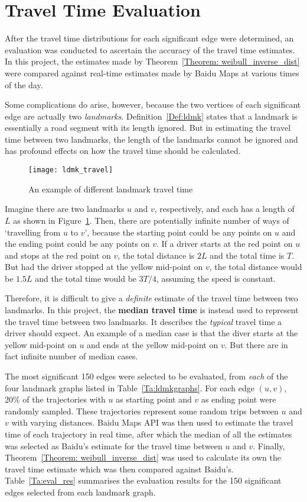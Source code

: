 \section{Travel Time Evaluation}
After the travel time distributions for each significant edge were determined, an eva\-luation was conducted to ascertain the accuracy of the travel time estimates. In this project, the estimates made by Theorem~\ref{Theorem: weibull_inverse_dist} were compared against real-time estimates made by Baidu Maps at various times of the day. 

Some complications do arise, however, because the two vertices of each significant edge are actually two \emph{landmarks}. Definition~\ref{Def:ldmk} states that a landmark is essentially a road segment with its length ignored. But in estimating the travel time between two landmarks, the length of the landmarks cannot be ignored and has profound effects on how the travel time should be calculated. 

\begin{figure}[h!]
\texttt{[image: ldmk\_travel]}
\centering
\caption{An example of different landmark travel time}\label{Fig:ldmk_travel}
\end{figure}

Imagine there are two landmarks $u$ and $v$, respectively, and each has a length of $L$ as shown in Figure~\ref{Fig:ldmk_travel}. Then, there are potentially infinite number of ways of `travelling from $u$ to $v$', because the starting point could be any points on $u$ and the ending point could be any points on $v$. If a driver starts at the red point on $u$ and stops at the red point on $v$, the total distance is $2L$ and the total time is $T$. But had the driver stopped at the yellow mid-point on $v$, the total distance would be $1.5L$ and the total time would be $3T/4$, assuming the speed is constant. 

Therefore, it is difficult to give a \emph{definite} estimate of the travel time between two landmarks. In this project, the \textbf{median travel time} is instead used to represent the travel time between two landmarks. It describes the \emph{typical} travel time a driver should expect. An example of a median case is that the diver starts at the yellow mid-point on $u$ and ends at the yellow mid-point on $v$. But there are in fact infinite number of median cases. 

The most significant 150 edges were selected to be evaluated, from \emph{each} of the four landmark graphs listed in Table~\ref{Ta:ldmkgraphs}. For each edge $(u, v)$, 20\% of the trajectories with $u$ as starting point and $v$ as ending point were randomly sampled. These trajectories represent some random trips between $u$ and $v$ with varying distances. Baidu Maps API was then used to estimate the travel time of each trajectory in real time, after which the median of all the estimates was selected as Baidu's estimate for the travel time between $u$ and $v$. Finally, Theorem~\ref{Theorem: weibull_inverse_dist} was used to calculate its own the travel time estimate which was then compared against Baidu's. Table~\ref{Ta:eval_res} summarises the evaluation results for the 150 significant edges selected from each landmark graph. 

